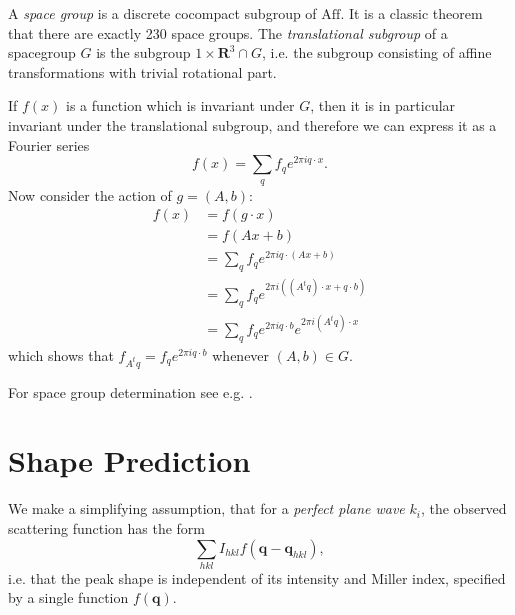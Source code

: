\documentclass[11pt,a4paper]{article}
\newcommand{\bq}{\mathbf{q}}
\newcommand{\Aff}{\mathrm{Aff}}
\begin{document}
A \emph{space group} is a discrete cocompact subgroup of $\Aff$. It is a classic theorem that there are exactly 230 space groups.
The \emph{translational subgroup} of a spacegroup $G$ is the subgroup ${1} \times \mathbf{R}^3 \cap G$, i.e. the subgroup consisting of
affine transformations with trivial rotational part.

If $f(x)$ is a function which is invariant under $G$, then it
is in particular invariant under the translational subgroup, and therefore we can express it as a Fourier series
\begin{equation} f(x) = \sum_q f_q e^{2\pi i q \cdot x}. \end{equation}
Now consider the action of $g = (A,b)$:
\begin{align}
  f(x)
  &= f(g\cdot x) \\
  &= f(Ax + b) \\
  &= \sum_q f_q e^{2\pi i q \cdot (Ax + b)} \\
  &= \sum_q f_q e^{2\pi i ((A^t q) \cdot x + q \cdot b)} \\
  &= \sum_q f_q e^{2 \pi i q \cdot b} e^{2\pi i (A^t q) \cdot x}
\end{align}
which shows that $f_{A^t q} = f_{q} e^{2 \pi i q \cdot b}$ whenever $(A,b) \in G$.


For space group determination see e.g. \cite{Eva11,Kab10b}.


\section{Shape Prediction} \label{peak-prediction}

We make a simplifying assumption, that for a \emph{perfect plane wave} $k_i$, the observed scattering function has the form
\begin{equation} \sum_{hkl} I_{hkl} f(\bq - \bq_{hkl}), \end{equation}
i.e. that the peak shape is independent of its intensity and Miller index, specified by a single function $f(\bq)$.
\end{document}
